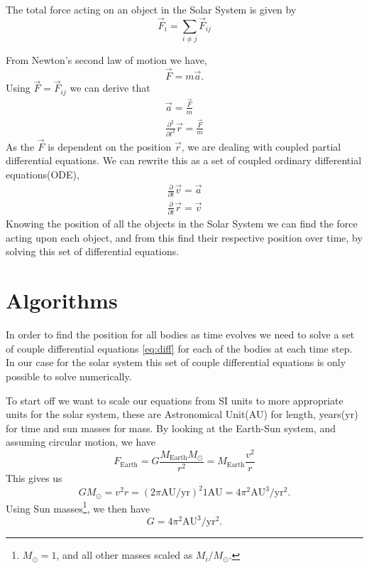 \documentclass[%
reprint,
nofootinbib,
amsmath,amssymb,
aps,
]{revtex4-1}
\begin{document}
The total force acting on an object in the Solar System is given by 
\begin{equation}
	\vec{F}_i = \sum_{i\neq j} \vec{F}_{ij}
\end{equation}

From Newton's second law of motion we have,
\begin{equation}
 \vec{F} = m\vec{a}.
\end{equation}
Using $\vec{F} = \vec{F}_{ij}$ we can derive that 
\begin{equation}
	\begin{split}
		\vec{a} = \frac{\vec{F}}{m}\\
		\frac{\partial^2 }{\partial t^2}\vec{r} = \frac{\vec{F}}{m}
	\end{split}
\end{equation}
As the $\vec{F}$ is dependent on the position $\vec{r}$, we are dealing with coupled partial differential equations. We can rewrite this as a set of coupled ordinary differential equations(ODE), 
\begin{equation}\label{eq:diff}
	\begin{split}
		\frac{\partial}{\partial t} \vec{v} = \vec{a}\\
		\frac{\partial}{\partial t} \vec{r} = \vec{v}
	\end{split}
\end{equation}
Knowing the position of all the objects in the Solar System we can find the force acting upon each object, and from this find their respective position over time, by solving this set of differential equations. 

\section{Algorithms}
In order to find the position for all bodies as time evolves we need to solve a set of couple differential equations \ref{eq:diff} for each of the bodies at each time step. In our case for the solar system this set of couple differential equations is only possible to solve numerically. 

To start off we want to scale our equations from SI units to more appropriate units for the solar system, these are Astronomical Unit(AU) for length, years(yr) for time and sun masses for mass. By looking at the Earth-Sun system, and assuming circular motion\cite{1994A&A...282..663S}, we have
\begin{equation}
	F_{\text{Earth}} = G\frac{M_{\text{Earth}}M_{\odot}}{r^2} = M_{\text{Earth}}\frac{v^2}{r}
\end{equation}
This gives us 
\begin{equation}
	GM_{\odot} = v^2 r = (2\pi \text{AU}/\text{yr})^2 1\text{AU} = 4\pi^2\text{AU}^3/\text{yr}^2.
\end{equation}
Using Sun masses\footnote{$M_{\odot} = 1$, and all other masses scaled as $M_i / M_{\odot}$.}, we then have 
\begin{equation}
	 G = 4\pi^2\text{AU}^3/\text{yr}^2.
\end{equation}
\end{document}
